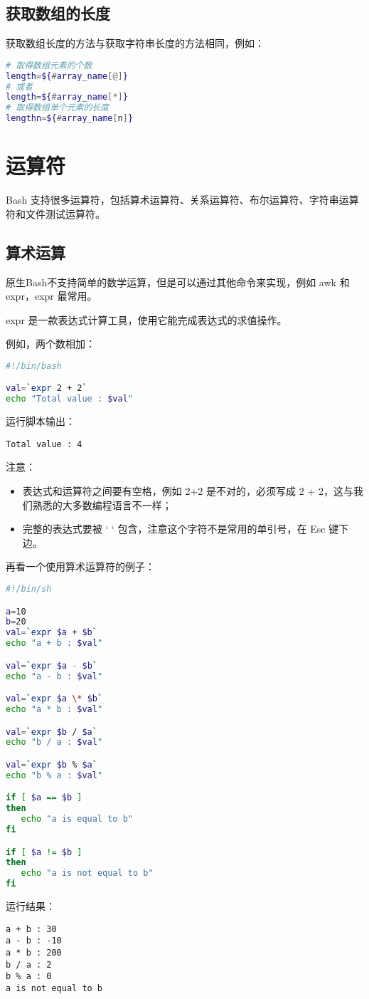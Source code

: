 \subsection{获取数组的长度}
获取数组长度的方法与获取字符串长度的方法相同，例如：
\begin{lstlisting}[language=sh]
# 取得数组元素的个数
length=${#array_name[@]}
# 或者
length=${#array_name[*]}
# 取得数组单个元素的长度
lengthn=${#array_name[n]}
\end{lstlisting}






\section{运算符}
Bash 支持很多运算符，包括算术运算符、关系运算符、布尔运算符、字符串运算符和文件测试运算符。


\subsection{算术运算}
原生Bash不支持简单的数学运算，但是可以通过其他命令来实现，例如 awk 和 expr，expr 最常用。

expr 是一款表达式计算工具，使用它能完成表达式的求值操作。

例如，两个数相加：
\begin{lstlisting}[language=sh]
#!/bin/bash

val=`expr 2 + 2`
echo "Total value : $val"
\end{lstlisting}
运行脚本输出：

\verb|Total value : 4|

注意：
\begin{itemize}
\item 表达式和运算符之间要有空格，例如 2+2 是不对的，必须写成 2 + 2，这与我们熟悉的大多数编程语言不一样；

\item 完整的表达式要被 ` ` 包含，注意这个字符不是常用的单引号，在 Esc 键下边。
\end{itemize}

再看一个使用算术运算符的例子：
\begin{lstlisting}[language=sh]
#!/bin/sh

a=10
b=20
val=`expr $a + $b`
echo "a + b : $val"

val=`expr $a - $b`
echo "a - b : $val"

val=`expr $a \* $b`
echo "a * b : $val"

val=`expr $b / $a`
echo "b / a : $val"

val=`expr $b % $a`
echo "b % a : $val"

if [ $a == $b ]
then
   echo "a is equal to b"
fi

if [ $a != $b ]
then
   echo "a is not equal to b"
fi
\end{lstlisting}
运行结果：
\begin{verbatim}
a + b : 30
a - b : -10
a * b : 200
b / a : 2
b % a : 0
a is not equal to b
\end{verbatim}

